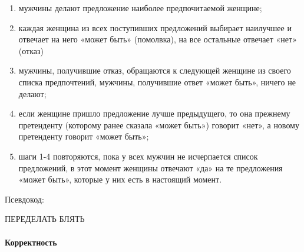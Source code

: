 \documentclass[a4paper,12pt]{article}
\begin{document}
\begin{enumerate}
    \item мужчины делают предложение наиболее предпочитаемой женщине;
    \item каждая женщина из всех поступивших предложений выбирает наилучшее и отвечает на него «может быть» (помолвка), на все остальные отвечает «нет» (отказ)
    \item мужчины, получившие отказ, обращаются к следующей женщине из своего списка предпочтений, мужчины, получившие ответ «может быть», ничего не делают;
    \item если женщине пришло предложение лучше предыдущего, то она прежнему претенденту (которому ранее сказала «может быть») говорит «нет», а новому претенденту говорит «может быть»;
    \item шаги 1-4 повторяются, пока у всех мужчин не исчерпается список предложений, в этот момент женщины отвечают «да» на те предложения «может быть», которые у них есть в настоящий момент.
\end{enumerate}

Псевдокод:

ПЕРЕДЕЛАТЬ БЛЯТЬ


\paragraph{Корректность}
\end{document}
